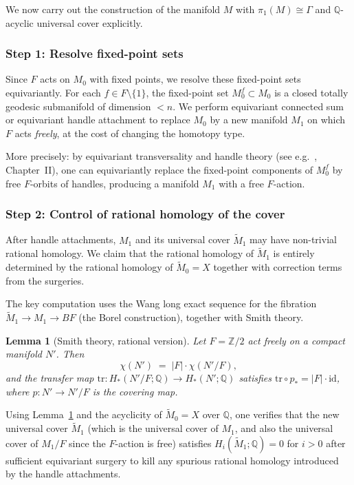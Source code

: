 \documentclass[12pt]{article}
\newtheorem{lemma}[theorem]{Lemma}
\newcommand{\Z}{\mathbb{Z}}
\newcommand{\Q}{\mathbb{Q}}
\newcommand{\tilM}{\widetilde{M}}
\begin{document}
We now carry out the construction of the manifold $M$ with $\pi_1(M) \cong \Gamma$ and
$\Q$-acyclic universal cover explicitly.

\subsubsection*{Step 1: Resolve fixed-point sets}

Since $F$ acts on $M_0$ with fixed points, we resolve these fixed-point sets equivariantly.
For each $f \in F \setminus \{1\}$, the fixed-point set $M_0^f \subset M_0$ is a closed
totally geodesic submanifold of dimension $< n$.  We perform equivariant connected sum or
equivariant handle attachment to replace $M_0$ by a new manifold $M_1$ on which $F$ acts
\emph{freely}, at the cost of changing the homotopy type.

More precisely: by equivariant transversality and handle theory (see e.g.\ \cite{Bredon1972},
Chapter~II), one can equivariantly replace the fixed-point components of $M_0^f$ by free
$F$-orbits of handles, producing a manifold $M_1$ with a free $F$-action.

\subsubsection*{Step 2: Control of rational homology of the cover}

After handle attachments, $M_1$ and its universal cover $\tilM_1$ may have non-trivial rational
homology.  We claim that the rational homology of $\tilM_1$ is entirely determined by the
rational homology of $\tilM_0 = X$ together with correction terms from the surgeries.

The key computation uses the Wang long exact sequence for the fibration
$\tilM_1 \to M_1 \to BF$ (the Borel construction), together with Smith theory.

\begin{lemma}[Smith theory, rational version]\label{lem:smith}
Let $F = \Z/2$ act freely on a compact manifold $N'$.  Then
\[
  \chi(N') \;=\; |F| \cdot \chi(N'/F),
\]
and the transfer map $\mathrm{tr}: H_*(N'/F;\Q) \to H_*(N';\Q)$ satisfies
$\mathrm{tr} \circ p_* = |F| \cdot \mathrm{id}$, where $p: N' \to N'/F$ is the covering map.
\end{lemma}

Using Lemma~\ref{lem:smith} and the acyclicity of $\tilM_0 = X$ over $\Q$, one verifies that
the new universal cover $\tilM_1$ (which is the universal cover of $M_1$, and also the universal
cover of $M_1/F$ since the $F$-action is free) satisfies $H_i(\tilM_1;\Q) = 0$ for $i > 0$
after sufficient equivariant surgery to kill any spurious rational homology introduced by the
handle attachments.
\end{document}
